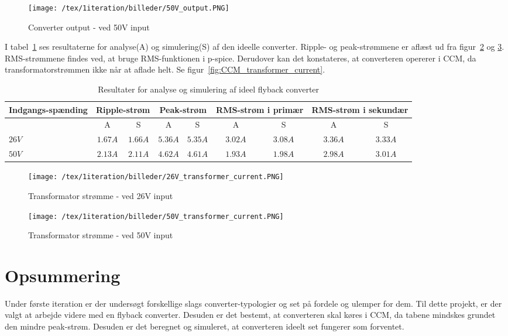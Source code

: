 \begin{figure}[H]
	\center
	\texttt{[image: /tex/1iteration/billeder/50V\_output.PNG]}
	\caption{Converter output - ved 50V input}
	\label{fig:50V_ideal_output}
\end{figure}

\noindent I tabel~\ref{tab:result_ideal_converter} ses resultaterne for analyse(A) og simulering(S) af den ideelle converter. Ripple- og peak-strømmene er aflæst ud fra figur~\ref{fig:26V_transformer_current} og \ref{fig:50V_transformer_current}. RMS-strømmene findes ved, at bruge RMS-funktionen i p-spice. Derudover kan det konstateres, at converteren opererer i CCM, da transformatorstrømmen ikke når at aflade helt. Se figur~\ref{fig:CCM_transformer_current}. 

\begin{table}[H] 			
	\centering
	\begin{tabularx}{\textwidth}{|X|c|c|c|c|c|c|c|c|}
		\hline
		\textbf{Indgangs-spænding} & \multicolumn{2}{|X|}{\textbf{Ripple-strøm}} & \multicolumn{2}{|X|}{\textbf{Peak-strøm}} & \multicolumn{2}{|X|}{\textbf{RMS-strøm i primær}} & \multicolumn{2}{|X|}{\textbf{RMS-strøm i sekundær}} \\ \hline
		& A & S & A & S & A & S & A & S \\ \hline
		$26V$ & $1.67A$ & $1.66A$ & $5.36A$ & $5.35A$ & $3.02A$ & $3.08A$ & $3.36A$ & $3.33A$ \\ \hline 
		$50V$ & $2.13A$ & $2.11A$ & $4.62A$ & $4.61A$ & $1.93A$ & $1.98A$ & $2.98A$ & $3.01A$ \\ \hline
	\end{tabularx}
	\caption{Resultater for analyse og simulering af ideel flyback converter}
	\label{tab:result_ideal_converter}
\end{table}

\begin{figure}[H]
	\center
	\texttt{[image: /tex/1iteration/billeder/26V\_transformer\_current.PNG]}
	\caption{Transformator strømme - ved 26V input}
	\label{fig:26V_transformer_current}
\end{figure}

\begin{figure}[H]
	\center
	\texttt{[image: /tex/1iteration/billeder/50V\_transformer\_current.PNG]}
	\caption{Transformator strømme - ved 50V input}
	\label{fig:50V_transformer_current}
\end{figure}

\section{Opsummering}
Under første iteration er der undersøgt forskellige slags converter-typologier og set på fordele og ulemper for dem. Til dette projekt, er der valgt at arbejde videre med en flyback converter. Desuden er det bestemt, at converteren skal køres i CCM, da tabene mindskes grundet den mindre peak-strøm. Desuden er det beregnet og simuleret, at converteren ideelt set fungerer som forventet.   

